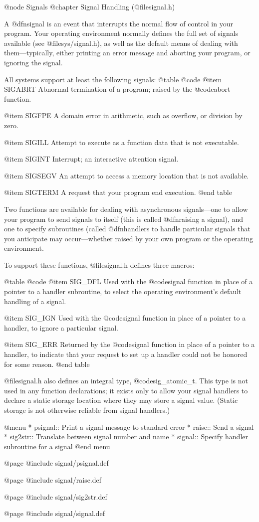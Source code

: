 @node Signals
@chapter Signal Handling (@file{signal.h})

A @dfn{signal} is an event that interrupts the normal flow of control
in your program.  Your operating environment normally defines the full
set of signals available (see @file{sys/signal.h}), as well as the
default means of dealing with them---typically, either printing an
error message and aborting your program, or ignoring the signal.

All systems support at least the following signals:
@table @code
@item SIGABRT
Abnormal termination of a program; raised by the @code{abort} function.

@item SIGFPE
A domain error in arithmetic, such as overflow, or division by zero.

@item SIGILL
Attempt to execute as a function data that is not executable.

@item SIGINT
Interrupt; an interactive attention signal.

@item SIGSEGV
An attempt to access a memory location that is not available.

@item SIGTERM
A request that your program end execution.
@end table

Two functions are available for dealing with asynchronous
signals---one to allow your program to send signals to itself (this is
called @dfn{raising} a signal), and one to specify subroutines (called
@dfn{handlers} to handle particular signals that you anticipate may
occur---whether raised by your own program or the operating environment.

To support these functions, @file{signal.h} defines three macros:

@table @code
@item SIG_DFL
Used with the @code{signal} function in place of a pointer to a
handler subroutine, to select the operating environment's default
handling of a signal.

@item SIG_IGN
Used with the @code{signal} function in place of a pointer to a
handler, to ignore a particular signal.

@item SIG_ERR
Returned by the @code{signal} function in place of a pointer to a
handler, to indicate that your request to set up a handler could not
be honored for some reason.
@end table

@file{signal.h} also defines an integral type, @code{sig_atomic_t}.
This type is not used in any function declarations; it exists only to
allow your signal handlers to declare a static storage location where
they may store a signal value.  (Static storage is not otherwise
reliable from signal handlers.)

@menu
* psignal:: Print a signal message to standard error
* raise::   Send a signal
* sig2str:: Translate between signal number and name
* signal::  Specify handler subroutine for a signal
@end menu

@page
@include signal/psignal.def

@page
@include signal/raise.def

@page
@include signal/sig2str.def

@page
@include signal/signal.def
